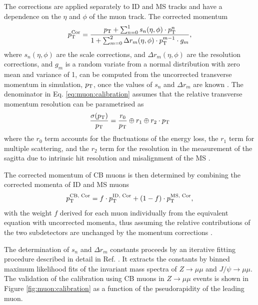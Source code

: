 The corrections are applied separately to ID and MS tracks and 
have a dependence on the $\eta$ and $\phi$ of the muon track. The
corrected momentum
\begin{equation}
p_{\text{T}}^\text{Cor} = \frac{p_{\text{T}} + \sum_{n=0}^1 s_n(\eta, \phi) \cdot p_{\text{T}}^n}
{1 + \sum_{m=0}^2 \Delta r_m (\eta, \phi) \cdot p_{\text{T}}^{m-1} \cdot g_m},
\label{eq:muon:calibration}
\end{equation}
where $s_n(\eta, \phi)$ are the scale corrections, and
$\Delta r_m (\eta, \phi)$ are the resolution corrections,
and $g_m$ is a random variate from a normal distribution with zero mean
and variance of 1, 
can be computed from the uncorrected transverse momentum in simulation,
$p_{\text{T}}$, once the values of $s_n$ and $\Delta r_m$ are known \cite{Aad:2016jkr}. The
denominator in Eq. \ref{eq:muon:calibration} assumes that the relative
transverse momentum resolution can be parametrised as
\begin{equation}
\frac{\sigma(p_{\text{T}})}{p_{\text{T}}} = \frac{r_0}{p_{\text{T}}} \oplus r_1 \oplus r_2 \cdot p_{\text{T}}
\end{equation}
where the $r_0$ term accounts for the fluctuations of the energy loss, the
$r_1$ term for multiple scattering, and the $r_2$ term for the
resolution in the measurement of the sagitta due to intrinsic hit resolution
and misalignment of the MS \cite{Aad:2016jkr}.

The corrected momentum of CB muons is then determined by combining the
corrected momenta of ID and MS muons
\begin{equation}
p_{\text{T}}^\text{CB, Cor} = f \cdot p_{\text{T}}^\text{ID, Cor} + (1-f) \cdot p_{\text{T}}^\text{MS, Cor},
\end{equation}
with the weight $f$ derived for each muon individually from the equivalent
equation with uncorrected momenta, thus assuming the relative contributions
of the two subdetectors are unchanged by the momentum corrections \cite{Aad:2016jkr}.

The determination of $s_n$ and $\Delta r_m$ constants proceeds by an
iterative fitting procedure described in detail in Ref. \cite{Aad:2016jkr}.
It extracts the constants by binned maximum likelihood fits of the
invariant mass spectra of $Z\rightarrow\mu\mu$ and $J/\psi\rightarrow\mu\mu$.
The validation of the calibration using CB muons in $Z\rightarrow\mu\mu$
events is shown in Figure \ref{fig:muon:calibration} as a function of the
pseudorapidity of the leading muon. 

